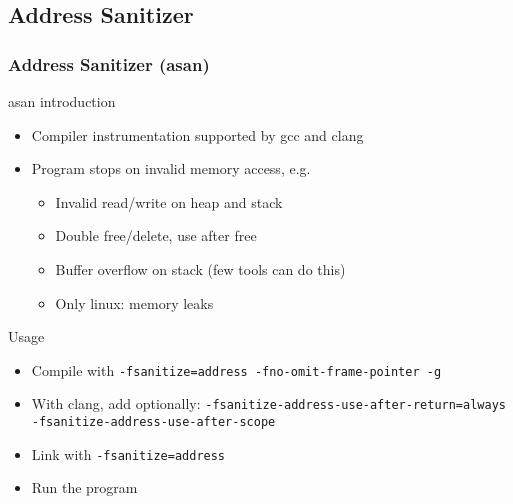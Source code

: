 \subsection[asan]{Address Sanitizer}

\begin{frame}[fragile]
  \frametitle{Address Sanitizer (asan)}
  \begin{block}{asan introduction}
    \begin{itemize}
    \item Compiler instrumentation supported by gcc and clang
    \item Program stops on invalid memory access, e.g.\
      \begin{itemize}
        \item Invalid read/write on heap and stack
        \item Double free/delete, use after free
        \item Buffer overflow on stack (few tools can do this)
        \item Only linux: memory leaks
      \end{itemize}
    \end{itemize}
  \end{block}
  \pause
  \begin{exampleblock}{Usage}
    \begin{itemize}
    \item Compile with \texttt{-fsanitize=address -fno-omit-frame-pointer -g}
    \item With clang, add optionally: \texttt{-fsanitize-address-use-after-return=always -fsanitize-address-use-after-scope}
    \item Link with \texttt{-fsanitize=address}
    \item Run the program
    \end{itemize}
  \end{exampleblock}
\end{frame}

